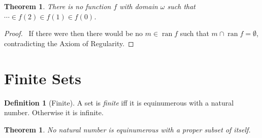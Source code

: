 \documentclass{article}
\let\qed\relax
\newtheorem{theorem}[axiom]{Theorem}
\theoremstyle{definition}
\newtheorem{definition}[axiom]{Definition}
\newcommand{\ran}{\ensuremath{\operatorname{ran}}}
\begin{document}
    \begin{theorem}
        There is no function $f$ with domain $\omega$ such that $\cdots \in f(2) \in f(1) \in f(0)$.
    \end{theorem}

    \begin{proof}
        \pf\ If there were then there would be no $m \in \ran f$ such that $m \cap \ran f = \emptyset$,
        contradicting the Axiom of Regularity. \qed
    \end{proof}
    
    \section{Finite Sets}

    \begin{definition}[Finite]
        A set is \emph{finite} iff it is equinumerous with a natural number. Otherwise it is infinite.
    \end{definition}

    \begin{theorem}
        No natural number is equinumerous with a proper subset of itself.
    \end{theorem}
\end{document}

